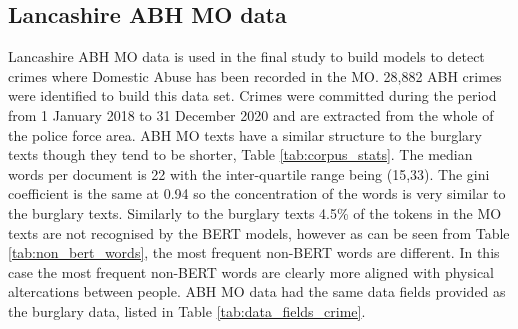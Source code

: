 \subsection{Lancashire ABH MO data} Lancashire ABH MO data is used in the final study to build models to detect crimes where Domestic Abuse has been recorded in the MO. 28,882 ABH crimes were identified to build this data set. Crimes were committed during the period from 1 January 2018 to 31 December 2020 and are extracted from the whole of the police force area. ABH MO texts have a similar structure to the burglary texts though they tend to be shorter, Table \ref{tab:corpus_stats}. The median words per document is 22 with the inter-quartile range being (15,33). The gini coefficient is the same at 0.94 so the concentration of the words is very similar to the burglary texts. Similarly to the burglary texts 4.5\% of the tokens in the MO texts are not recognised by the BERT models, however as can be seen from Table \ref{tab:non_bert_words}, the most frequent non-BERT words are different. In this case the most frequent non-BERT words are clearly more aligned with physical altercations between people. ABH MO data had the same data fields provided as the burglary data, listed in Table \ref{tab:data_fields_crime}.

